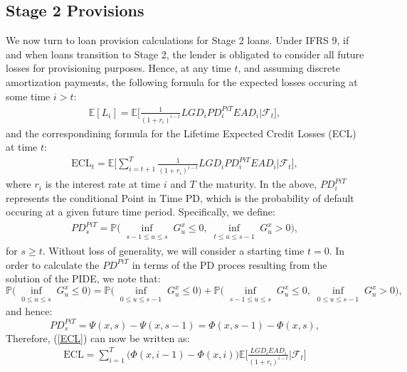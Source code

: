 \documentclass[11pt,reqno]{article}
\theoremstyle{definition}
\begin{document}
\subsection{Stage 2 Provisions}
We now turn to loan provision calculations for Stage 2 loans. Under IFRS 9, if and when loans transition to Stage 2, the lender is obligated to consider all future losses for provisioning purposes. Hence, at any time $t$, and assuming discrete amortization payments, the following formula for the expected losses occuring at some time $i > t$:
\begin{eqnarray}
	\mathbb{E}[L_i] = \mathbb{E} \Big[ \frac{1}{(1+r_i)^{i-t}} LGD_i PD^{PiT}_i EAD_i | \mathcal{F}_t\Big],
\end{eqnarray}
and the correspondining formula for the Lifetime Expected Credit Losses (ECL) at time $t$:
\begin{eqnarray}\label{ECL}
\text{ECL}_t =  \mathbb{E} \Big[\sum_{i=t+1}^{T} \frac{1}{(1+r_i)^{i-t}} LGD_i PD^{PiT}_i EAD_i | \mathcal{F}_t\Big],
\end{eqnarray}
where $r_i$ is the interest rate at time $i$ and $T$ 
the maturity. In the above, $PD^{PiT}_i$ represents the conditional Point in Time PD, which is the probability of default occuring at a given future time period. Specifically, we define:
\begin{eqnarray} \label{pitpd}
	PD^{PiT}_s =  \mathbb{P}\big(\inf_{\substack{s-1 \leq u \leq s}} G_u^x \leq 0, \inf_{\substack{t \leq u \leq s-1}} G_u^x > 0\big),
\end{eqnarray} 
for $s \geq t $. Without loss of generality, we will consider a starting time $t=0$. In order to calculate the $PD^{PiT}$ in terms of the PD proces resulting from the solution of the PIDE, we note that:
$$  \mathbb{P}\big(\inf_{\substack{0 \leq u \leq s}} G_u^x \leq 0) = \mathbb{P}\big(\inf_{\substack{0 \leq u \leq s-1}} G_u^x \leq 0) + \mathbb{P}\big(\inf_{\substack{s-1 \leq u \leq s}} G_u^x \leq 0, \inf_{\substack{0 \leq u \leq s-1}} G_u^x > 0\big),$$ and hence:
$$PD^{PiT}_s  = \Psi(x,s)  -\Psi(x,s-1) = \Phi(x,s-1)  -\Phi(x,s),$$ %
Therefore, (\ref{ECL}) can now be written as:
\begin{eqnarray} \label{ecl2}
\text{ECL} = \sum_{i=1}^{T}\big(\Phi(x,i-1)  -\Phi(x,i)\big)\mathbb{E} \Big[\frac{LGD_i  EAD_i}{(1+r_i)^{i-t}} | \mathcal{F}_t \Big]
\end{eqnarray}
\end{document}
